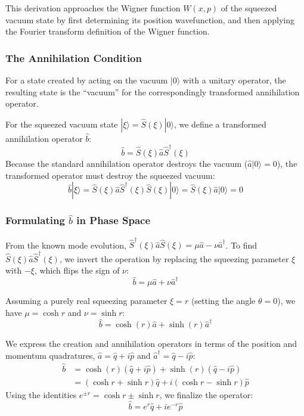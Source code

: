 This derivation approaches the Wigner function $W(x,p)$ of the squeezed vacuum state by first determining its position wavefunction, and then applying the Fourier transform definition of the Wigner function.

\subsubsection{The Annihilation Condition}
For a state created by acting on the vacuum $|0\rangle$ with a unitary operator, the resulting state is the ``vacuum'' for the correspondingly transformed annihilation operator. 

For the squeezed vacuum state $|\xi\rangle = \hat{S}(\xi)|0\rangle$, we define a transformed annihilation operator $\hat{b}$:
\begin{equation*}
\hat{b} = \hat{S}(\xi)\hat{a}\hat{S}^\dagger(\xi)
\end{equation*}
Because the standard annihilation operator destroys the vacuum ($\hat{a}|0\rangle = 0$), the transformed operator must destroy the squeezed vacuum:
\begin{equation*}
\hat{b}|\xi\rangle = \hat{S}(\xi)\hat{a}\hat{S}^\dagger(\xi) \hat{S}(\xi)|0\rangle = \hat{S}(\xi)\hat{a}|0\rangle = 0
\end{equation*}

\subsubsection{Formulating $\hat{b}$ in Phase Space}
From the known mode evolution, $\hat{S}^\dagger(\xi)\hat{a}\hat{S}(\xi) = \mu\hat{a} - \nu\hat{a}^\dagger$. To find $\hat{S}(\xi)\hat{a}\hat{S}^\dagger(\xi)$, we invert the operation by replacing the squeezing parameter $\xi$ with $-\xi$, which flips the sign of $\nu$:
\begin{equation*}
\hat{b} = \mu\hat{a} + \nu\hat{a}^\dagger
\end{equation*}

Assuming a purely real squeezing parameter $\xi = r$ (setting the angle $\theta = 0$), we have $\mu = \cosh r$ and $\nu = \sinh r$:
\begin{equation*}
\hat{b} = \cosh(r)\hat{a} + \sinh(r)\hat{a}^\dagger
\end{equation*}

We express the creation and annihilation operators in terms of the position and momentum quadratures, $\hat{a} = \hat{q} + i\hat{p}$ and $\hat{a}^\dagger = \hat{q} - i\hat{p}$:
\begin{align*}
\hat{b} &= \cosh(r)(\hat{q} + i\hat{p}) + \sinh(r)(\hat{q} - i\hat{p}) \\
&= (\cosh r + \sinh r)\hat{q} + i(\cosh r - \sinh r)\hat{p}
\end{align*}
Using the identities $e^{\pm r} = \cosh r \pm \sinh r$, we finalize the operator:
\begin{equation*}
\hat{b} = e^{r}\hat{q} + i e^{-r} \hat{p}
\end{equation*}

